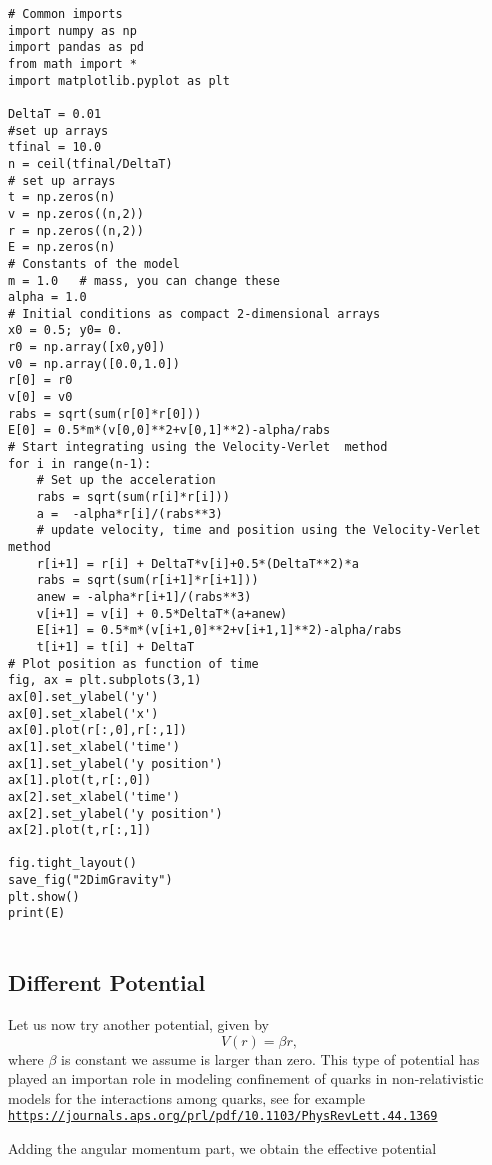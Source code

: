 \documentclass[%
oneside,                 %
final,                   %
10pt]{article}
\begin{document}
\begin{verbatim}
# Common imports
import numpy as np
import pandas as pd
from math import *
import matplotlib.pyplot as plt

DeltaT = 0.01
#set up arrays 
tfinal = 10.0
n = ceil(tfinal/DeltaT)
# set up arrays
t = np.zeros(n)
v = np.zeros((n,2))
r = np.zeros((n,2))
E = np.zeros(n)
# Constants of the model
m = 1.0   # mass, you can change these
alpha = 1.0
# Initial conditions as compact 2-dimensional arrays
x0 = 0.5; y0= 0.
r0 = np.array([x0,y0]) 
v0 = np.array([0.0,1.0])
r[0] = r0
v[0] = v0
rabs = sqrt(sum(r[0]*r[0]))
E[0] = 0.5*m*(v[0,0]**2+v[0,1]**2)-alpha/rabs
# Start integrating using the Velocity-Verlet  method
for i in range(n-1):
    # Set up the acceleration
    rabs = sqrt(sum(r[i]*r[i]))
    a =  -alpha*r[i]/(rabs**3)
    # update velocity, time and position using the Velocity-Verlet method
    r[i+1] = r[i] + DeltaT*v[i]+0.5*(DeltaT**2)*a
    rabs = sqrt(sum(r[i+1]*r[i+1]))
    anew = -alpha*r[i+1]/(rabs**3)
    v[i+1] = v[i] + 0.5*DeltaT*(a+anew)
    E[i+1] = 0.5*m*(v[i+1,0]**2+v[i+1,1]**2)-alpha/rabs
    t[i+1] = t[i] + DeltaT
# Plot position as function of time
fig, ax = plt.subplots(3,1)
ax[0].set_ylabel('y')
ax[0].set_xlabel('x')
ax[0].plot(r[:,0],r[:,1])
ax[1].set_xlabel('time')
ax[1].set_ylabel('y position')
ax[1].plot(t,r[:,0])
ax[2].set_xlabel('time')
ax[2].set_ylabel('y position')
ax[2].plot(t,r[:,1])

fig.tight_layout()
save_fig("2DimGravity")
plt.show()
print(E)


\end{verbatim}


\subsection*{Different Potential}

Let us now try another potential, given by
\[
V(r) = \beta r,
\]
where $\beta$ is constant we assume is larger than zero. This type of potential has played an importan role in modeling confinement of quarks in non-relativistic models for the interactions among quarks, see for example \href{{https://journals.aps.org/prl/pdf/10.1103/PhysRevLett.44.1369}}{\nolinkurl{https://journals.aps.org/prl/pdf/10.1103/PhysRevLett.44.1369}} 

Adding the angular momentum part, we obtain the effective potential
\end{document}
